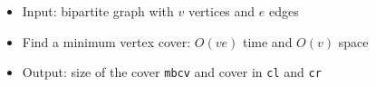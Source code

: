 \begin{itemize}
	\item Input: bipartite graph with $v$ vertices and $e$ edges
	\item Find a minimum vertex cover: $O(ve)$ time and $O(v)$ space
	\item Output: size of the cover \lstinline{mbcv} and cover in \lstinline{cl} and \lstinline{cr}
\end{itemize}
